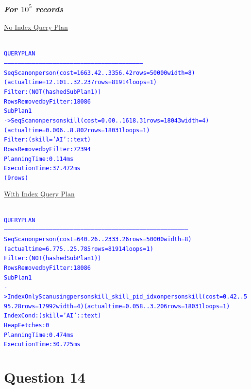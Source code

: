 \documentclass{article}
\begin{document}
    \subsubsection*{\emph{For $10^5$ records}}
    \underline{No Index Query Plan}
    \begin{center}
      {\tiny
      \begin{alltt}
      \textcolor{blue}{
        QUERY PLAN                                                       
        ------------------------------------------------------------------------------------------------------------------------
         Seq Scan on person  (cost=1663.42..3356.42 rows=50000 width=8) (actual time=12.101..32.237 rows=81914 loops=1)
           Filter: (NOT (hashed SubPlan 1))
           Rows Removed by Filter: 18086
           SubPlan 1
             ->  Seq Scan on personskill  (cost=0.00..1618.31 rows=18043 width=4) (actual time=0.006..8.802 rows=18031 loops=1)
                   Filter: (skill = 'AI'::text)
                   Rows Removed by Filter: 72394
         Planning Time: 0.114 ms
         Execution Time: 37.472 ms
        (9 rows)
       }
      \end{alltt}
      }
    \end{center}
    \underline{With Index Query Plan}
    \begin{center}
      {\tiny
      \begin{alltt}
      \textcolor{blue}{
        QUERY PLAN                                                                          
        --------------------------------------------------------------------------------------------------------------------------------------------------------------
         Seq Scan on person  (cost=640.26..2333.26 rows=50000 width=8) (actual time=6.775..25.785 rows=81914 loops=1)
           Filter: (NOT (hashed SubPlan 1))
           Rows Removed by Filter: 18086
           SubPlan 1
             ->  Index Only Scan using personskill_skill_pid_idx on personskill  (cost=0.42..595.28 rows=17992 width=4) (actual time=0.058..3.206 rows=18031 loops=1)
                   Index Cond: (skill = 'AI'::text)
                   Heap Fetches: 0
         Planning Time: 0.474 ms
         Execution Time: 30.725 ms
       }
      \end{alltt}
      }
    \end{center}
    
    \section*{Question 14}
\end{document}
